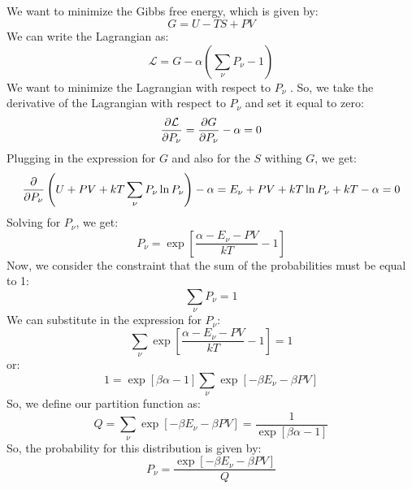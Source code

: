 \documentclass[10pt]{article}
\begin{document}
\begin{enumerate}
\subsection{}
We want to minimize the Gibbs free energy, which is given by:
\begin{equation}
  G = U - TS + PV
\end{equation}
We can write the Lagrangian as:
\begin{equation}
  \mathcal{L} = G - \alpha \left( \sum_{\nu} P_{\nu} - 1 \right)
\end{equation}
We want to minimize the Lagrangian with respect to $P_{\nu}$ . So, we take the derivative of the Lagrangian with respect to $P_{\nu}$ and set it equal to zero:
\begin{equation}
  \pdv{\mathcal{L}}{P_{\nu}} = \pdv{G}{P_{\nu}} - \alpha = 0
\end{equation}
Plugging in the expression for $G$ and also for the $S$ withing $G$, we get:
\begin{equation}
  \pdv{P_{\nu}} \left( U + PV + kT \sum_{\nu} P_{\nu} \ln P_{\nu} \right) - \alpha = E_{\nu} + PV + kT \ln P_{\nu} + kT - \alpha = 0
\end{equation}
Solving for $P_{\nu}$, we get:
\begin{equation}
  P_{\nu} = \exp \left[ \frac{ \alpha - E_{\nu} - PV}{kT} - 1 \right]
\end{equation}
Now, we consider the constraint that the sum of the probabilities must be equal to 1:
\begin{equation}
  \sum_{\nu} P_{\nu} = 1
\end{equation}
We can substitute in the expression for $P_{\nu}$:
\begin{equation}
  \sum_{\nu} \exp \left[ \frac{ \alpha - E_{\nu} - PV}{kT} - 1 \right] = 1
\end{equation}
or:
\begin{equation}
  1 = \exp \left[\beta \alpha - 1 \right] \sum_{\nu} \exp \left[ - \beta E_{\nu} - \beta PV \right]
\end{equation}
So, we define our partition function as:
\begin{equation}
  Q = \sum_{\nu} \exp \left[ - \beta E_{\nu} - \beta PV \right] = \frac{1}{\exp \left[\beta \alpha - 1 \right]}
\end{equation}
So, the probability for this distribution is given by:
\begin{equation}
  P_{\nu} = \frac{\exp \left[ - \beta E_{\nu} - \beta PV \right]}{Q}
\end{equation}

\end{enumerate}
\end{document}
